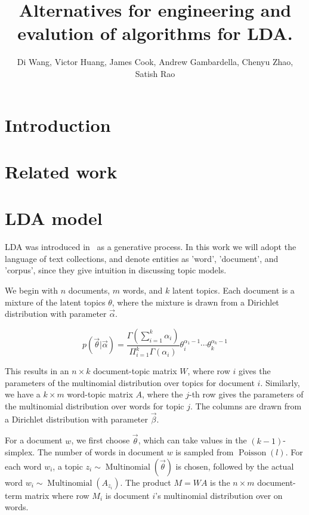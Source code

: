 \documentclass{sig-alternate}
\title{Alternatives for engineering and evalution of algorithms for LDA.}
\author{Di Wang,  Victor Huang, James Cook, Andrew Gambardella,  Chenyu Zhao, Satish Rao}
\date{}
\begin{document}
\maketitle

\begin{abstract}



\end{abstract}

\section{Introduction} \label{sec:intro}


\section{Related work}

\label{sec:related}

%
\section{LDA model} \label{sec:ldamodel}
LDA was introduced in~\cite{Blei2003a} as a generative process. In
this work we will adopt the language of text collections, and denote
entities as 'word', 'document', and 'corpus', since they give
intuition in discussing topic models.

We begin with $ n $ documents, $ m $ words, and $ k $ latent topics. Each
document is a mixture of the latent topics $ \theta $, where the mixture is
drawn from a Dirichlet distribution with parameter $\vec{\alpha}$. 

\[
p(\vec{\theta}|\vec{\alpha})=\frac{\Gamma(\sum_{i=1}^k\alpha_i)}{\Pi_{i=1}^k\Gamma(\alpha_i)}\theta_i^{\alpha_1-1}\cdots\theta_k^{\alpha_k-1}
\] 

This results in an $n\times k$ document-topic matrix $ W $, where row $ i $ gives the parameters of the multinomial
distribution over topics for document $ i $. Similarly, we have a $ k \times m $ word-topic matrix $A$,
where the $j$-th row gives the parameters of the multinomial distribution
over words for topic $j$. The columns are drawn from a Dirichlet distribution with parameter
$ \vec{\beta} $.

For a document $w$, we first choose $\vec{\theta}$, which can take values in the $(k-1)$-simplex.
The number of words in document $w$ is sampled from $\operatorname{Poisson}(l)$. For each word $w_i$, a
topic $z_i\sim \operatorname{Multinomial}(\vec{\theta})$ is chosen, followed by the actual
word $w_i\sim \operatorname{Multinomial}(A_{z_i})$. The product $M=WA$ is the $n\times m$
document-term matrix where row $M_i$ is document $i$'s multinomial distribution over
on words.
\end{document}
